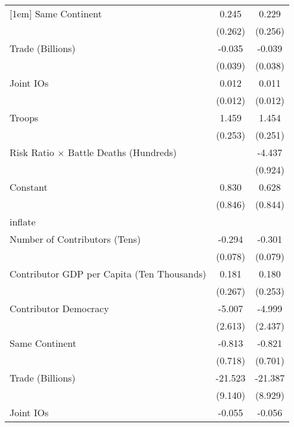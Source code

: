 \begin{table}[htbp]
\begin{tabular}{l*{2}{c}}
[1em]
Same Continent      &       0.245        &       0.229        \\
                    &     (0.262)        &     (0.256)        \\
[1em]
Trade (Billions)    &      -0.035        &      -0.039        \\
                    &     (0.039)        &     (0.038)        \\
[1em]
Joint IOs           &       0.012        &       0.011        \\
                    &     (0.012)        &     (0.012)        \\
[1em]
Troops              &       1.459\sym{**}&       1.454\sym{**}\\
                    &     (0.253)        &     (0.251)        \\
[1em]
Risk Ratio $\times$ Battle Deaths (Hundreds)&                    &      -4.437\sym{**}\\
                    &                    &     (0.924)        \\
[1em]
Constant            &       0.830        &       0.628        \\
                    &     (0.846)        &     (0.844)        \\
\hline
inflate             &                    &                    \\
Number of Contributors (Tens)&      -0.294\sym{**}&      -0.301\sym{**}\\
                    &     (0.078)        &     (0.079)        \\
[1em]
Contributor GDP per Capita (Ten Thousands)&       0.181        &       0.180        \\
                    &     (0.267)        &     (0.253)        \\
[1em]
Contributor Democracy&      -5.007\sym{+} &      -4.999\sym{*} \\
                    &     (2.613)        &     (2.437)        \\
[1em]
Same Continent      &      -0.813        &      -0.821        \\
                    &     (0.718)        &     (0.701)        \\
[1em]
Trade (Billions)    &     -21.523\sym{*} &     -21.387\sym{*} \\
                    &     (9.140)        &     (8.929)        \\
[1em]
Joint IOs           &      -0.055\sym{**}&      -0.056\sym{**}\\

\end{tabular}
\end{table}
